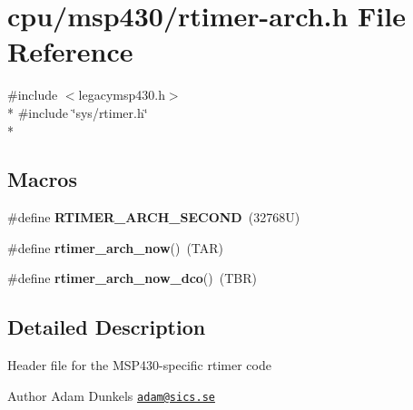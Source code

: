 \hypertarget{rtimer-arch_8h}{\section{cpu/msp430/rtimer-\/arch.h File Reference}
\label{rtimer-arch_8h}
}
{\ttfamily \#include $<$legacymsp430.\-h$>$}\\*
{\ttfamily \#include \char`\"{}sys/rtimer.\-h\char`\"{}}\\*
\subsection*{Macros}
\begin{DoxyCompactItemize}
\item 
\hypertarget{rtimer-arch_8h_ac084a751a46dee3ef5aef0f3b44f129c}{\#define {\bfseries R\-T\-I\-M\-E\-R\-\_\-\-A\-R\-C\-H\-\_\-\-S\-E\-C\-O\-N\-D}~(32768\-U)}\label{rtimer-arch_8h_ac084a751a46dee3ef5aef0f3b44f129c}

\item 
\hypertarget{rtimer-arch_8h_a23c6e4dd2c6c61f76431e4a9c30778ad}{\#define {\bfseries rtimer\-\_\-arch\-\_\-now}()~(T\-A\-R)}\label{rtimer-arch_8h_a23c6e4dd2c6c61f76431e4a9c30778ad}

\item 
\hypertarget{rtimer-arch_8h_a9d97682987c8ac8afcf2c8c1e34e49ab}{\#define {\bfseries rtimer\-\_\-arch\-\_\-now\-\_\-dco}()~(T\-B\-R)}\label{rtimer-arch_8h_a9d97682987c8ac8afcf2c8c1e34e49ab}

\end{DoxyCompactItemize}


\subsection{Detailed Description}
\begin{DoxyVerb}    Header file for the MSP430-specific rtimer code
\end{DoxyVerb}
 \begin{DoxyAuthor}{Author}
Adam Dunkels \href{mailto:adam@sics.se}{\tt adam@sics.\-se} 
\end{DoxyAuthor}
